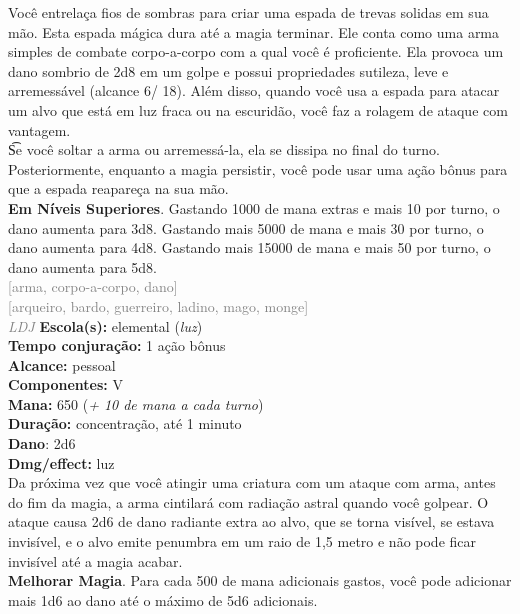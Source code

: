 \documentclass{RPG_Adventure}[2021/10/20]
\begin{document}
{\normalsize Você entrelaça fios de sombras para criar uma espada de trevas solidas em sua mão. Esta espada mágica dura até a magia terminar. Ele conta como uma arma simples de combate corpo-a-corpo com a qual você é proficiente. Ela provoca um dano sombrio de 2d8 em um golpe e possui propriedades sutileza, leve e arremessável (alcance 6/ 18). Além disso, quando você usa a espada para atacar um alvo que está em luz fraca ou na escuridão, você faz a rolagem de ataque com vantagem.\\\t Se você soltar a arma ou arremessá-la, ela se dissipa no final do turno. Posteriormente, enquanto a magia persistir, você pode usar uma ação bônus para que a espada reapareça na sua mão.\\\t \textbf{Em Níveis Superiores}. Gastando 1000 de mana extras e mais 10 por turno, o dano aumenta para 3d8. Gastando mais 5000 de mana e mais 30 por turno, o dano aumenta para 4d8. Gastando mais 15000 de mana e mais 50 por turno, o dano aumenta para 5d8.\\}
{\scriptsize \textcolor{gray}{[arma, corpo-a-corpo, dano]\\}}
{\scriptsize \textcolor{gray}{[arqueiro, bardo, guerreiro, ladino, mago, monge]\\}}
{\tiny \textcolor{gray}{\textit{LDJ}}}\jump{}
{\small \t \textbf{Escola(s):} elemental (\textit{luz})\\\t \textbf{Tempo conjuração:} 1 ação bônus\\\t \textbf{Alcance:} pessoal\\\t \textbf{Componentes:} V\\\t \textbf{Mana:} 650 (\textit{+ 10 de mana a cada turno})\\\t \textbf{Duração:} concentração, até 1 minuto\\\t \textbf{Dano}: 2d6\\\t \textbf{Dmg/effect:} luz\\}
{\normalsize Da próxima vez que você atingir uma criatura com um ataque com arma, antes do fim da magia, a arma cintilará com radiação astral quando você golpear. O ataque causa 2d6 de dano radiante extra ao alvo, que se torna visível, se estava invisível, e o alvo emite penumbra em um raio de 1,5 metro e não pode ficar invisível até a magia acabar.\\\t \textbf{Melhorar Magia}. Para cada 500 de mana adicionais gastos, você pode adicionar mais 1d6 ao dano até o máximo de 5d6 adicionais.\\}
\end{document}
